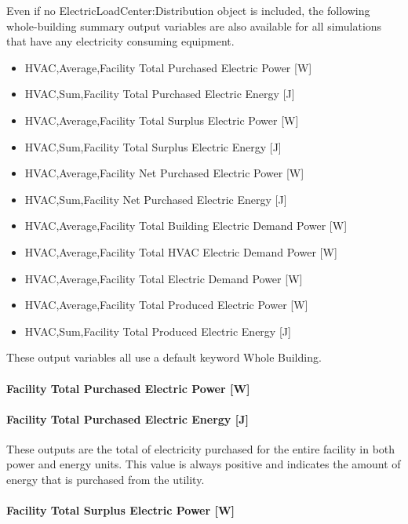 Even if no ElectricLoadCenter:Distribution object is included, the following whole-building summary output variables are also available for all simulations that have any electricity consuming equipment.

\begin{itemize}
\tightlist
\item
  HVAC,Average,Facility Total Purchased Electric Power {[}W{]}
\item
  HVAC,Sum,Facility Total Purchased Electric Energy {[}J{]}
\item
  HVAC,Average,Facility Total Surplus Electric Power {[}W{]}
\item
  HVAC,Sum,Facility Total Surplus Electric Energy {[}J{]}
\item
  HVAC,Average,Facility Net Purchased Electric Power {[}W{]}
\item
  HVAC,Sum,Facility Net Purchased Electric Energy {[}J{]}
\item
  HVAC,Average,Facility Total Building Electric Demand Power {[}W{]}
\item
  HVAC,Average,Facility Total HVAC Electric Demand Power {[}W{]}
\item
  HVAC,Average,Facility Total Electric Demand Power {[}W{]}
\item
  HVAC,Average,Facility Total Produced Electric Power {[}W{]}
\item
  HVAC,Sum,Facility Total Produced Electric Energy {[}J{]}
\end{itemize}

These output variables all use a default keyword Whole Building.

\paragraph{Facility Total Purchased Electric Power {[}W{]}}\label{facility-total-purchased-electric-power-w}

\paragraph{Facility Total Purchased Electric Energy {[}J{]}}\label{facility-total-purchased-electric-energy-j}

These outputs are the total of electricity purchased for the entire facility in both power and energy units. This value is always positive and indicates the amount of energy that is purchased from the utility.

\paragraph{Facility Total Surplus Electric Power {[}W{]}}\label{facility-total-surplus-electric-power-w}

